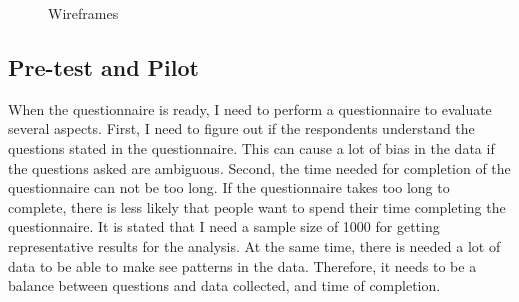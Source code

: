     \begin{figure}[H]
      \ContinuedFloat
      \caption{Wireframes}
    \end{figure}

  \subsection{Pre-test and Pilot}\label{sec:pretest}
    When the questionnaire is ready, I need to perform a questionnaire to evaluate several aspects. First, I need to figure out if the respondents understand the questions stated in the questionnaire. This can cause a lot of bias in the data if the questions asked are ambiguous. Second, the time needed for completion of the questionnaire can not be too long. If the questionnaire takes too long to complete, there is less likely that people want to spend their time completing the questionnaire. It is stated that I need a sample size of 1000 for getting representative results for the analysis. At the same time, there is needed a lot of data to be able to make see patterns in the data. Therefore, it needs to be a balance between questions and data collected, and time of completion. 


